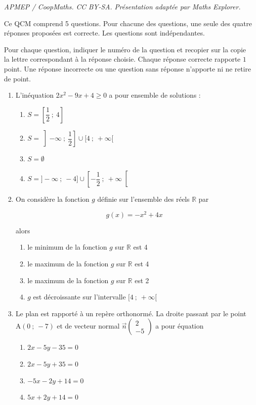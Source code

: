 \documentclass[10pt]{article}
\providecommand{\R}{\mathbb{R}}
\providecommand{\vect}[1]{\overrightarrow{#1}}
\begin{document}
\noindent\textit{APMEP / CoopMaths. CC BY-SA. Présentation adaptée par Maths Explorer.}\par\medskip
\medskip


Ce QCM comprend 5 questions. Pour chacune des questions, une seule des quatre réponses proposées est correcte. Les questions sont indépendantes.

Pour chaque question, indiquer le numéro de la question et recopier sur la copie la lettre correspondant à la réponse choisie. Chaque réponse correcte rapporte $1$ point. Une réponse incorrecte ou une question sans réponse n'apporte ni ne retire de point.

\medskip

\begin{enumerate}
\item 
L'inéquation $2x^2 - 9x +4 \geqslant 0$ a pour ensemble de solutions :
	\begin{enumerate}
		\item $S= \left[\dfrac{1}{2}~;~4\right]$
		\item $S = \left ]-\infty~;~\dfrac{1}{2}\right ] \cup  [4~;~+\infty$[
		\item $S = \emptyset$ 
		\item $S = ]- \infty~;~-4] \cup \left [- \dfrac{1}{2}~;~+\infty\right [$
	\end{enumerate}
	
	\medskip
	
\item On considère la fonction $g$ définie sur l'ensemble des réels $\R$ par 

\[g(x) = -x^2 +4x\]

alors
	\begin{enumerate}
		\item le minimum de la fonction $g$ sur $\R$ est 4
		\item  le maximum de la fonction $g$ sur $\R$ est 4
		\item  le maximum de la fonction $g$ sur $\R$ est 2
		\item  $g$ est décroissante sur l'intervalle $[4~;~ +\infty[$
	\end{enumerate}
	
		\medskip

\item Le plan est rapporté à un repère orthonormé. La droite passant par le point A$(0~;~-7)$ et de vecteur normal $\vect{n}\begin{pmatrix}2\\-5\end{pmatrix}$ a pour équation
	\begin{enumerate}
		\item $2x - 5y - 35 = 0$ 
		\item $2x- 5y + 35 = 0$ 
		\item $-5x - 2y + 14 = 0$ 
		\item $5x+ 2y+ 14 = 0$
	\end{enumerate}
	

\end{enumerate}
\end{document}
